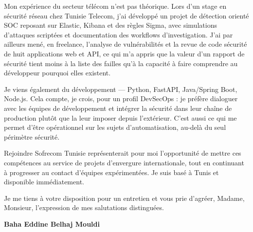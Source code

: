 \documentclass[a4paper,11pt]{article}
\begin{document}
Mon expérience du secteur télécom n'est pas théorique. Lors d'un stage en sécurité réseau chez Tunisie Telecom, j'ai développé un projet de détection orienté SOC reposant sur Elastic, Kibana et des règles Sigma, avec simulations d'attaques scriptées et documentation des workflows d'investigation. J'ai par ailleurs mené, en freelance, l'analyse de vulnérabilités et la revue de code sécurité de huit applications web et API, ce qui m'a appris que la valeur d'un rapport de sécurité tient moins à la liste des failles qu'à la capacité à faire comprendre au développeur pourquoi elles existent.

Je viens également du développement --- Python, FastAPI, Java/Spring Boot, Node.js. Cela compte, je crois, pour un profil DevSecOps : je préfère dialoguer avec les équipes de développement et intégrer la sécurité dans leur chaîne de production plutôt que la leur imposer depuis l'extérieur. C'est aussi ce qui me permet d'être opérationnel sur les sujets d'automatisation, au-delà du seul périmètre sécurité.

Rejoindre Sofrecom Tunisie représenterait pour moi l'opportunité de mettre ces compétences au service de projets d'envergure internationale, tout en continuant à progresser au contact d'équipes expérimentées. Je suis basé à Tunis et disponible immédiatement.

Je me tiens à votre disposition pour un entretien et vous prie d'agréer, Madame, Monsieur, l'expression de mes salutations distinguées.

\vspace{0.8cm}

\begin{flushright}
{\bfseries Baha Eddine Belhaj Mouldi}
\end{flushright}
\end{document}
